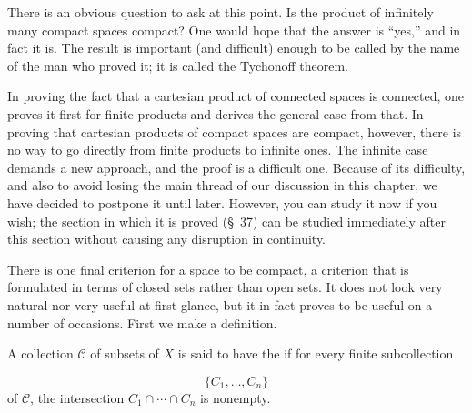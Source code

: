 There is an obvious question to ask at this point. Is the product of infinitely many compact spaces compact? One would hope that the answer is ``yes,'' and in fact it is. The result is important (and difficult) enough to be called by the name of the man who proved it; it is called the Tychonoff theorem.

In proving the fact that a cartesian product of connected spaces is connected, one proves it first for finite products and derives the general case from that. In proving that cartesian products of compact spaces are compact, however, there is no way to go directly from finite products to infinite ones. The infinite case demands a new approach, and the proof is a difficult one. Because of its difficulty, and also to avoid losing the main thread of our discussion in this chapter, we have decided to postpone it until later. However, you can study it now if you wish; the section in which it is proved (\S\ 37) can be studied immediately after this section without causing any disruption in continuity.

There is one final criterion for a space to be compact, a criterion that is formulated in terms of closed sets rather than open sets. It does not look very natural nor very useful at first glance, but it in fact proves to be useful on a number of occasions. First we make a definition.

\begin{definition}
 A collection \(\mathcal{C}\) of subsets of \(X\) is said to have the  if for every finite subcollection

 \[
 \{ {C_{1},\ldots ,C_{n}}\}
 \]
 of \(\mathcal{C}\), the intersection \(C_{1} \cap \cdots \cap {C}_{n}\) is nonempty.
\end{definition}

